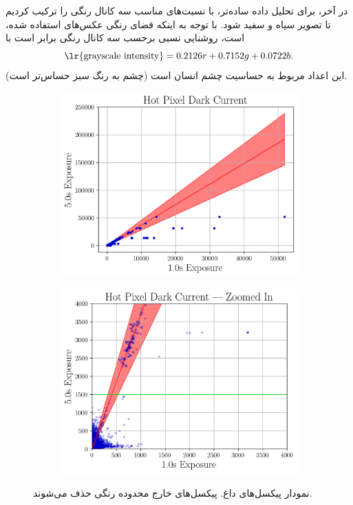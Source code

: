 \documentclass[12pt,a4paper]{article}
\begin{document}
	در آخر، برای تحلیل داده ساده‌تر، با نسبت‌های مناسب سه کانال رنگی را ترکیب کردیم تا تصویر سیاه و سفید شود.
	با توجه به اینکه فضای رنگی عکس‌های استفاده شده،  است، روشنایی نسبی برحسب سه کانال رنگی برابر است با
	\begin{equation}
		\text{\lr{grayscale intensity}} = 0.2126r + 0.7152g + 0.0722b.
	\end{equation}
	این اعداد مربوط به حساسیت چشم انسان است (چشم به رنگ سبز حساس‌تر است).
	\begin{figure}
		\centering
		\begin{subfigure}{0.49\linewidth}
			\centering
			\includegraphics[width=\linewidth]{../fig/hotpix}
		\end{subfigure}
		\begin{subfigure}{0.49\linewidth}
			\centering
			\includegraphics[width=\linewidth]{../fig/hotpix_zoom}
		\end{subfigure}
		\caption{نمودار پیکسل‌های داغ. پیکسل‌های خارج محدوده رنگی حذف می‌شوند.}
	\end{figure}
\end{document}

